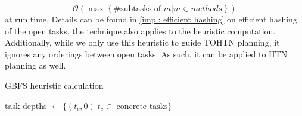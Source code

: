 \[
\mathcal{O}\left(\max \left\{ \# \text{subtasks of } m | m \in methods \right\} \right)
\] at run time. Details can be found in \ref{impl: efficient hashing} on efficient hashing of the open tasks, the technique also applies to the heuristic computation. Additionally, while we only use this heuristic to guide TOHTN planning, it ignores any orderings between open tasks. As such, it can be applied to HTN planning as well.

\begin{algorithm}
	\caption{GBFS heuristic calculation}
	\label{algo: gbfs heuristic}
	task depths $\gets \{(t_c, 0) | t_c \in \text{ concrete tasks}\}$\;
\end{algorithm}


